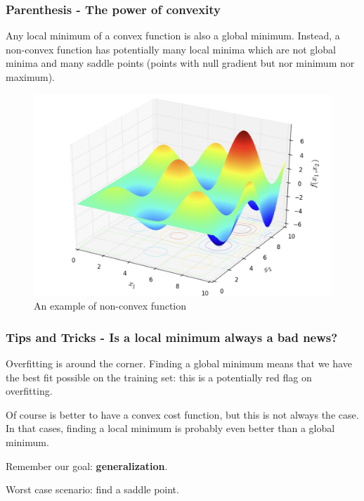 \documentclass{beamer}
\begin{document}
	\begin{frame}
		\frametitle{Parenthesis - The power of convexity}
		Any local minimum of a convex function is also a global minimum. 
		Instead, a non-convex function has potentially many local minima which are not global minima and many saddle points (points with null gradient but nor minimum nor maximum).
		
		\begin{figure}
			\centering
			\includegraphics[scale=0.3]{images/non_convex}
			\caption{An example of non-convex function}
		\end{figure}
	\end{frame}

	\begin{frame}
		\frametitle{Tips and Tricks - Is a local minimum always a bad news?}
		
		Overfitting is around the corner. Finding a global minimum means that we have the best fit possible on the training set: this is a potentially red flag on overfitting.
		
		\vspace{5mm}
		
		Of course is better to have a convex cost function, but this is not always the case. In that cases, finding a local minimum is probably even better than a global minimum. 
		
		Remember our goal: \textbf{generalization}.
		
		\vspace{5mm}
		
		Worst case scenario: find a saddle point.
	\end{frame}
\end{document}
